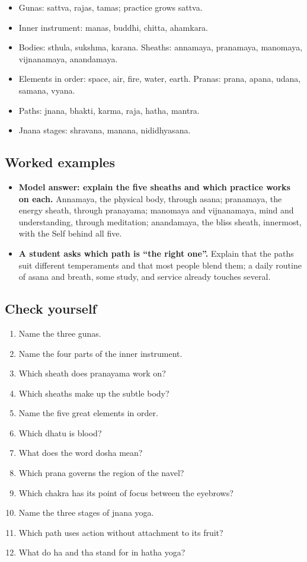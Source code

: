 \begin{recall}
\begin{itemize}
\item Gunas: sattva, rajas, tamas; practice grows sattva.
\item Inner instrument: manas, buddhi, chitta, ahamkara.
\item Bodies: sthula, sukshma, karana. Sheaths: annamaya, pranamaya, manomaya, vijnanamaya, anandamaya.
\item Elements in order: space, air, fire, water, earth. Pranas: prana, apana, udana, samana, vyana.
\item Paths: jnana, bhakti, karma, raja, hatha, mantra.
\item Jnana stages: shravana, manana, nididhyasana.
\end{itemize}
\end{recall}

\subsection*{Worked examples}
\begin{itemize}
\item \textbf{Model answer: explain the five sheaths and which practice works on each.} Annamaya, the physical body, through asana; pranamaya, the energy sheath, through pranayama; manomaya and vijnanamaya, mind and understanding, through meditation; anandamaya, the bliss sheath, innermost, with the Self behind all five.
\item \textbf{A student asks which path is ``the right one''.} Explain that the paths suit different temperaments and that most people blend them; a daily routine of asana and breath, some study, and service already touches several.
\end{itemize}

\subsection*{Check yourself}
\begin{enumerate}
\item Name the three gunas.
\item Name the four parts of the inner instrument.
\item Which sheath does pranayama work on?
\item Which sheaths make up the subtle body?
\item Name the five great elements in order.
\item Which dhatu is blood?
\item What does the word dosha mean?
\item Which prana governs the region of the navel?
\item Which chakra has its point of focus between the eyebrows?
\item Name the three stages of jnana yoga.
\item Which path uses action without attachment to its fruit?
\item What do ha and tha stand for in hatha yoga?
\end{enumerate}

